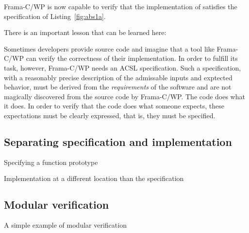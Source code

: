 Frama-C\slash WP is now capable to verify that the implementation of
 satisfies the specification of Listing~\ref{fig:abs1a}.

There is an important lesson that can be learned here:

\begin{framed}
Sometimes developers provide source code and imagine that a tool
like Frama-C\slash WP can verify the correctness of their implementation.
In order to fulfill its task, however, Frama-C\slash WP needs an ACSL specification. 
Such a specification, with a reasonably precise description of the admissable inputs
and exptected behavior, must be derived from the \emph{requirements} of the software
and are not magically discovered from the source code by Frama-C\slash WP.
The code does what it does. 
In order to verify that the code does what someone expects, these expectations
must be clearly expressed, that is, they must be specified.
\end{framed}


\FloatBarrier

\subsection{Separating specification and implementation}

\begin{listing}[hbt]
\begin{minipage}{\textwidth}

\end{minipage}
\caption{\label{fig:abs2-h} Specifying a function prototype}
\end{listing}


\begin{listing}[hbt]
\begin{minipage}{\textwidth}

\end{minipage}
\caption{\label{fig:abs2-c} Implementation at a different location than the specification}
\end{listing}

\FloatBarrier

\subsection{Modular verification}

\begin{listing}[hbt]
\begin{minipage}{\textwidth}

\end{minipage}
\caption{\label{fig:use_abs2-1} A simple example of modular verification}
\end{listing}

